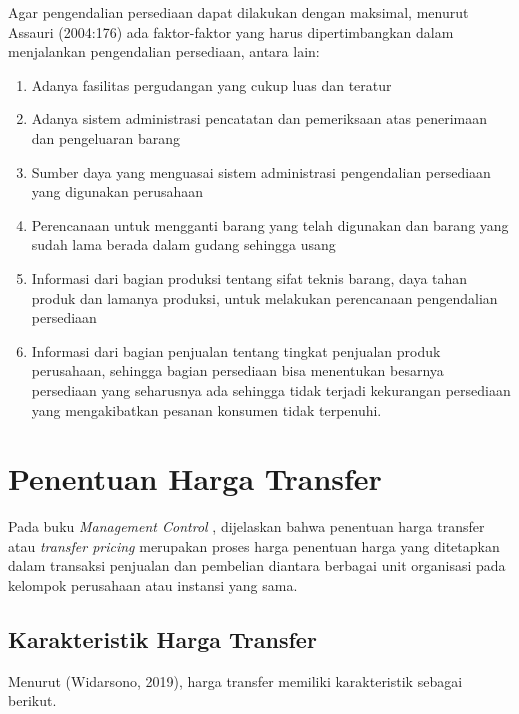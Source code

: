 Agar pengendalian persediaan dapat dilakukan dengan maksimal, menurut Assauri (2004:176) ada faktor-faktor yang harus dipertimbangkan dalam menjalankan pengendalian persediaan, antara lain:

\begin{enumerate}
	\item Adanya fasilitas pergudangan yang cukup luas dan teratur
	\item Adanya sistem administrasi pencatatan dan pemeriksaan atas penerimaan dan pengeluaran barang
	\item Sumber daya yang menguasai sistem administrasi pengendalian persediaan yang digunakan perusahaan
	\item Perencanaan untuk mengganti barang yang telah digunakan dan barang yang sudah lama berada dalam gudang sehingga usang
	\item Informasi dari bagian produksi tentang sifat teknis barang, daya tahan produk dan lamanya produksi, untuk melakukan perencanaan pengendalian persediaan
	\item Informasi dari bagian penjualan tentang tingkat penjualan produk perusahaan, sehingga bagian persediaan bisa menentukan besarnya persediaan yang seharusnya ada sehingga tidak terjadi kekurangan persediaan yang mengakibatkan pesanan konsumen tidak terpenuhi.
\end{enumerate}

\section{Penentuan Harga Transfer}

Pada buku \textit{Management Control} \citep{manajemencontrol}, dijelaskan bahwa penentuan harga transfer atau \textit{transfer pricing} merupakan proses harga penentuan harga yang ditetapkan dalam transaksi penjualan dan pembelian diantara berbagai unit organisasi pada kelompok perusahaan atau instansi yang sama.

\subsection{Karakteristik Harga Transfer}

Menurut (Widarsono, 2019), harga transfer memiliki karakteristik sebagai berikut.

